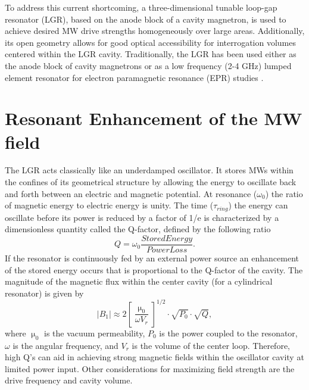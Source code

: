 To address this current shortcoming, a three-dimensional tunable loop-gap resonator (LGR), based on the anode block of a cavity magnetron, is used to achieve desired MW drive strengths homogeneously over large areas. Additionally, its open geometry allows for good optical accessibility for interrogation volumes centered within the LGR cavity. Traditionally, the LGR has been used either as the anode block of cavity magnetrons \cite{collins1948microwave} or as a low frequency (2-4 GHz) lumped element resonator for electron paramagnetic resonance (EPR) studies \cite{rinard2005loopgap}.  

\section{Resonant Enhancement of the MW field}\label{resonant_enhc}

The LGR acts classically like an underdamped oscillator. It stores MWs within the confines of its geometrical structure by allowing the energy to oscillate back and forth between an electric and magnetic potential. At resonance ($\omega_0$) the ratio of magnetic energy to electric energy is unity. The time ($\tau_{ring}$) the energy can oscillate before its power is reduced by a factor of 1/e is characterized by a dimensionless quantity called the Q-factor, defined by the following ratio
\begin{equation}
Q = \omega_0 \frac{Stored Energy}{Power Loss}.
\end{equation}
If the resonator is continuously fed by an external power source an enhancement of the stored energy occurs that is proportional to the Q-factor of the cavity. The magnitude of the magnetic flux within the center cavity (for a cylindrical resonator) is given by
\begin{equation} \label{B1approx}
|B_1| \approx  2\left[\frac{\upmu_0}{\omega V_r}\right]^{1/2} \cdot \sqrt{P_0} \cdot \sqrt{Q},
\end{equation}
where $\upmu_0$ is the vacuum permeability, $P_0$ is the power coupled to the resonator, $\omega$ is the angular frequency, and $V_r$ is the volume of the center loop. Therefore, high Q's can aid in achieving strong magnetic fields within the oscillator cavity at limited power input. Other considerations for maximizing field strength are the drive frequency and cavity volume.



